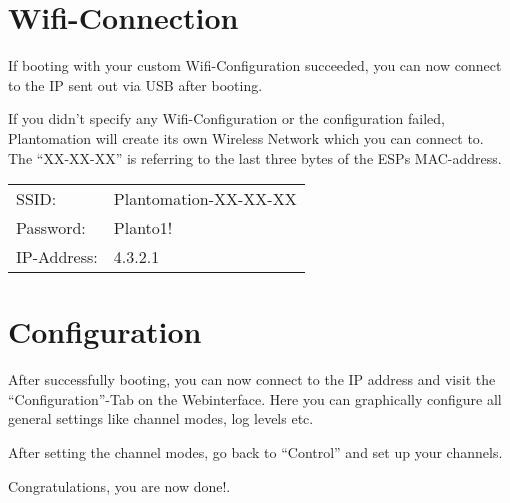\section{Wifi-Connection}
If booting with your custom Wifi-Configuration succeeded, you can now connect to the IP sent out via USB after booting.

If you didn't specify any Wifi-Configuration or the configuration failed, Plantomation will create its own Wireless Network which you can connect to. The ``XX-XX-XX'' is referring to the last three bytes of the ESPs MAC-address.

\begin{tabular}{ll}
SSID: & Plantomation-XX-XX-XX\\
Password: & Planto1!\\
IP-Address: & 4.3.2.1
\end{tabular}

\section{Configuration}
After successfully booting, you can now connect to the IP address and visit the ``Configuration''-Tab on the Webinterface. Here you can graphically configure all general settings like channel modes, log levels etc. 

After setting the channel modes, go back to ``Control'' and set up your channels. 

Congratulations, you are now done!.